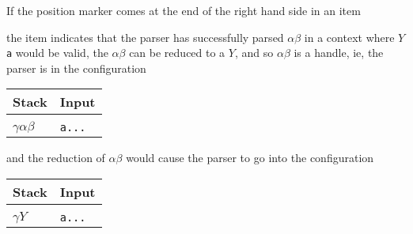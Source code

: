 \documentclass[8pt,a4paper,compress,handout]{beamer}
\newcommand{\mm}[1]{$#1$}
\newenvironment{spaced}
{
\smallskip
\hspace{.5cm}
\begin{minipage}[c]{\textwidth}
}
{
\end{minipage}
\smallskip
}
\begin{document}
\begin{frame}[fragile]
\pause

If the position marker comes at the end of the right hand side in an item

\begin{spaced}
\begin{production}
[Y ::= \mm{\alpha \beta \cdot}, \lstinline{a}]
\end{production}
\end{spaced}

\noindent the item indicates that the parser has successfully parsed $\alpha \beta$ in a context where $Y$\lstinline{a} would be valid, the $\alpha \beta$ can be reduced to a $Y$, and so $\alpha \beta$ is a handle, ie, the parser  is in the configuration

\begin{table}[H]
\begin{tabular}{ll}
Stack & Input \\ \hline \\
$\gamma \alpha \beta$ & \lstinline$a...$
\end{tabular}
\end{table}

\noindent and the reduction of $\alpha \beta$ would cause the parser to go into the configuration

\begin{table}[H]
\begin{tabular}{ll}
Stack & Input \\ \hline \\
$\gamma Y$ & \lstinline$a...$
\end{tabular}
\end{table}
\end{frame}
\end{document}
